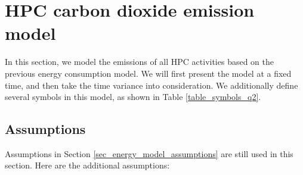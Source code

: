 \documentclass[12pt]{article}
\begin{document}
\section{HPC carbon dioxide emission model}

In this section, we model the  emissions of all HPC activities based on the previous energy consumption model. We will first present the model at a fixed time, and then take the time variance into consideration. We additionally define several symbols in this model, as shown in Table \ref{table_symbols_q2}.

\subsection{Assumptions}

Assumptions in Section \ref{sec_energy_model_assumptions} are still used in this section. Here are the additional assumptions:
\end{document}
